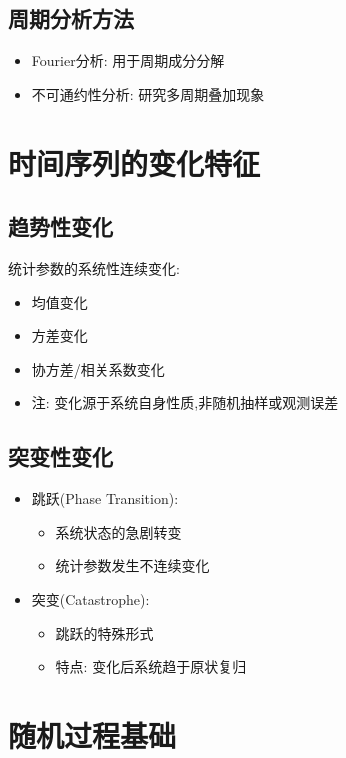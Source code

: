 \subsection{周期分析方法}
\begin{itemize}
    \item Fourier分析: 用于周期成分分解
    \item 不可通约性分析: 研究多周期叠加现象
\end{itemize}

\section{时间序列的变化特征}

\subsection{趋势性变化}
统计参数的系统性连续变化:
\begin{itemize}
    \item 均值变化
    \item 方差变化
    \item 协方差/相关系数变化
    \item 注: 变化源于系统自身性质,非随机抽样或观测误差
\end{itemize}

\subsection{突变性变化}
\begin{itemize}
    \item 跳跃(Phase Transition):
        \begin{itemize}
            \item 系统状态的急剧转变
            \item 统计参数发生不连续变化
        \end{itemize}
    \item 突变(Catastrophe):
        \begin{itemize}
            \item 跳跃的特殊形式
            \item 特点: 变化后系统趋于原状复归
        \end{itemize}
\end{itemize}

\section{随机过程基础}

